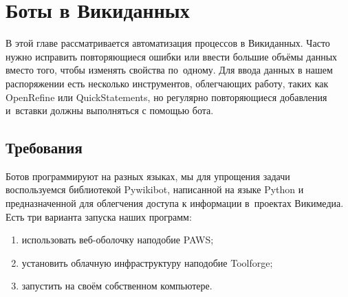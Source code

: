 \chapter{Боты в Викиданных}
\label{ch:bots}

\makeatletter
\long{}%
\makeatother



В этой главе рассматривается автоматизация процессов в Викиданных. 
Часто нужно исправить повторяющиеся ошибки или ввести большие объёмы данных 
вместо того, чтобы изменять свойства по~одному. 
Для ввода данных в нашем распоряжении есть несколько инструментов, облегчающих работу, 
таких как OpenRefine %
 или QuickStatements, но регулярно повторяющиеся добавления и~вставки должны выполняться с помощью бота.


\section{Требования}
\label{sec:requirements}

Ботов программируют на разных языках, мы для упрощения задачи воспользуемся библиотекой Pywikibot, 
написанной на языке Python и предназначенной для облегчения доступа 
к информации в~проектах Викимедиа. Есть три варианта запуска наших программ:
\begin{enumerate}[1)]
  \item использовать веб-оболочку наподобие PAWS; 
  \item установить облачную инфраструктуру наподобие Toolforge;
  \item запустить на своём собственном компьютере.
\end{enumerate}

